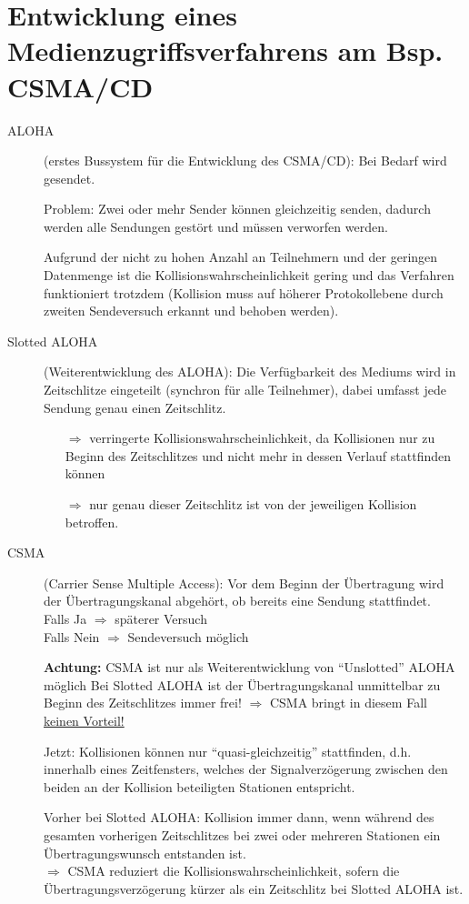 \section{Entwicklung eines Medienzugriffsverfahrens am Bsp. CSMA/CD}
\begin{description}
\item[ALOHA] (erstes Bussystem für die Entwicklung des CSMA/CD): Bei Bedarf wird gesendet.
\par
Problem: Zwei oder mehr Sender können gleichzeitig senden, dadurch werden alle Sendungen gestört und müssen verworfen werden.
\par
Aufgrund der nicht zu hohen Anzahl an Teilnehmern und der geringen Datenmenge ist die Kollisionswahrscheinlichkeit gering und das Verfahren funktioniert trotzdem (Kollision muss auf höherer Protokollebene durch zweiten Sendeversuch erkannt und behoben werden).

\item[Slotted ALOHA] (Weiterentwicklung des ALOHA): Die Verfügbarkeit des Mediums wird in Zeitschlitze eingeteilt (synchron für alle Teilnehmer), dabei umfasst jede Sendung genau einen Zeitschlitz.
\begin{itemize}
\item[$\Rightarrow$] verringerte Kollisionswahrscheinlichkeit, da Kollisionen nur zu Beginn des Zeitschlitzes und nicht mehr in dessen Verlauf stattfinden können \item[$\Rightarrow$] nur genau dieser Zeitschlitz ist von der jeweiligen Kollision betroffen.
\end{itemize}

\item[CSMA] (Carrier Sense Multiple Access): Vor dem Beginn der Übertragung wird der Übertragungskanal abgehört, ob bereits eine Sendung stattfindet.\\
Falls Ja $\Rightarrow$ späterer Versuch\\
Falls Nein $\Rightarrow$ Sendeversuch möglich
\par
\textbf{Achtung:} CSMA ist nur als Weiterentwicklung von “Unslotted” ALOHA möglich
Bei Slotted ALOHA ist der Übertragungskanal unmittelbar zu Beginn des Zeitschlitzes immer frei!
$\Rightarrow$ CSMA bringt in diesem Fall \underline{keinen Vorteil!}
\par
Jetzt: Kollisionen können nur “quasi-gleichzeitig” stattfinden, d.h. innerhalb eines Zeitfensters, welches der Signalverzögerung zwischen den beiden an der Kollision beteiligten Stationen entspricht.
\par
Vorher bei Slotted ALOHA: Kollision immer dann, wenn während des gesamten vorherigen Zeitschlitzes bei zwei oder mehreren Stationen ein Übertragungswunsch entstanden ist.\\
$\Rightarrow$ CSMA reduziert die Kollisionswahrscheinlichkeit, sofern die Übertragungsverzögerung kürzer als ein Zeitschlitz bei Slotted ALOHA ist.


\end{description}
